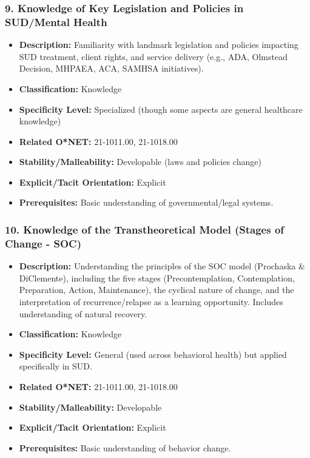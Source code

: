 \documentclass[
  letterpaper,
  DIV=11,
  numbers=noendperiod]{scrartcl}
\providecommand{\tightlist}{%
  \setlength{\itemsep}{0pt}\setlength{\parskip}{0pt}}
\begin{document}
\subsubsection{9. Knowledge of Key Legislation and Policies in
SUD/Mental
Health}\label{knowledge-of-key-legislation-and-policies-in-sudmental-health}

\begin{itemize}
\tightlist
\item
  \textbf{Description:} Familiarity with landmark legislation and
  policies impacting SUD treatment, client rights, and service delivery
  (e.g., ADA, Olmstead Decision, MHPAEA, ACA, SAMHSA initiatives).
\item
  \textbf{Classification:} Knowledge
\item
  \textbf{Specificity Level:} Specialized (though some aspects are
  general healthcare knowledge)
\item
  \textbf{Related O*NET:} 21-1011.00, 21-1018.00
\item
  \textbf{Stability/Malleability:} Developable (laws and policies
  change)
\item
  \textbf{Explicit/Tacit Orientation:} Explicit
\item
  \textbf{Prerequisites:} Basic understanding of governmental/legal
  systems.
\end{itemize}

\subsubsection{10. Knowledge of the Transtheoretical Model (Stages of
Change -
SOC)}\label{knowledge-of-the-transtheoretical-model-stages-of-change---soc}

\begin{itemize}
\tightlist
\item
  \textbf{Description:} Understanding the principles of the SOC model
  (Prochaska \& DiClemente), including the five stages
  (Precontemplation, Contemplation, Preparation, Action, Maintenance),
  the cyclical nature of change, and the interpretation of
  recurrence/relapse as a learning opportunity. Includes understanding
  of natural recovery.
\item
  \textbf{Classification:} Knowledge
\item
  \textbf{Specificity Level:} General (used across behavioral health)
  but applied specifically in SUD.
\item
  \textbf{Related O*NET:} 21-1011.00, 21-1018.00
\item
  \textbf{Stability/Malleability:} Developable
\item
  \textbf{Explicit/Tacit Orientation:} Explicit
\item
  \textbf{Prerequisites:} Basic understanding of behavior change.
\end{itemize}
\end{document}
